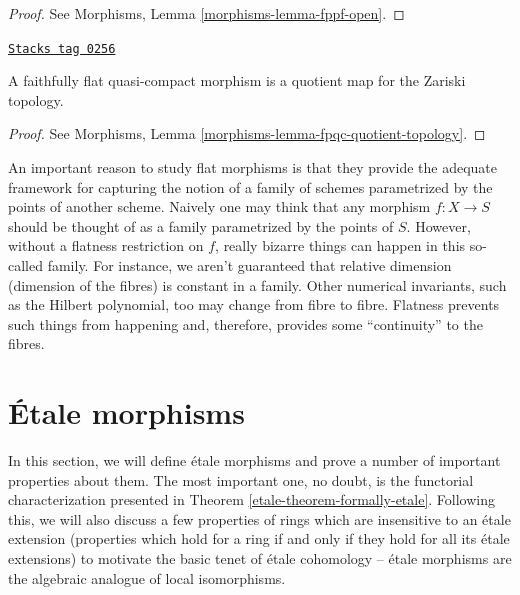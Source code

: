 \begin{proof}
See Morphisms, Lemma \ref{morphisms-lemma-fppf-open}.
\end{proof}

\begin{theorem}
\label{etale-theorem-flat-is-quotient}
\href{https://stacks.math.columbia.edu/tag/0256}{\texttt{Stacks tag 0256}}

A faithfully flat quasi-compact morphism is a quotient map for
the Zariski topology.
\end{theorem}

\begin{proof}
See Morphisms, Lemma \ref{morphisms-lemma-fpqc-quotient-topology}.
\end{proof}

An important reason to study flat morphisms is that they provide the adequate
framework for capturing the notion of a family of schemes parametrized by the
points of another scheme. Naively one may think that any morphism $f : X \to S$
should be thought of as a family parametrized by the points of $S$. However,
without a flatness restriction on $f$, really bizarre things can happen in
this so-called family. For instance, we aren't guaranteed that relative
dimension (dimension of the fibres) is constant in a family. Other numerical
invariants, such as the Hilbert polynomial, too may change from fibre to
fibre. Flatness prevents such things from happening and, therefore, provides
some ``continuity'' to the fibres.

\section{\'Etale morphisms}
\label{etale-section-etale-morphisms}
In this section, we will define \'etale morphisms and prove a number of
important properties about them. The most important one, no doubt, is the
functorial characterization presented in Theorem \ref{etale-theorem-formally-etale}.
Following this, we will also discuss a few properties of rings which are
insensitive to an \'etale extension (properties which hold for a ring
if and only if they hold for all its \'etale extensions) to motivate the basic
tenet of \'etale cohomology -- \'etale morphisms are the algebraic analogue of
local isomorphisms.

